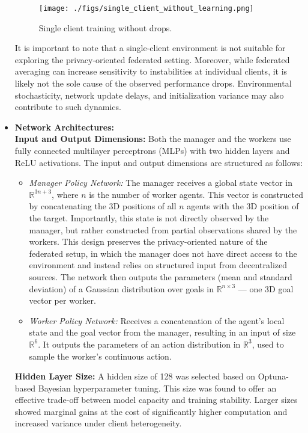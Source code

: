 \documentclass[12pt,a4paper,twoside,openany]{book}
\begin{document}
\begin{itemize}
\begin{figure}[h]
\centering
\texttt{[image: ./figs/single\_client\_without\_learning.png]}
\captionsetup{font=small}
\caption{Single client training without drops.}
\label{fig:single_client_stable}
\end{figure}

It is important to note that a single-client environment is not suitable for exploring the privacy-oriented federated setting. Moreover, while federated averaging can increase sensitivity to instabilities at individual clients, it is likely not the sole cause of the observed performance drops. Environmental stochasticity, network update delays, and initialization variance may also contribute to such dynamics.

\item \textbf{Network Architectures:} \\[0.5em]
\textbf{Input and Output Dimensions:} Both the manager and the workers use fully connected multilayer perceptrons (MLPs) with two hidden layers and ReLU activations. The input and output dimensions are structured as follows:
\begin{itemize}
   \item \textit{Manager Policy Network:} The manager receives a global state vector in $\mathbb{R}^{3n + 3}$, where $n$ is the number of worker agents. This vector is constructed by concatenating the 3D positions of all $n$ agents with the 3D position of the target. Importantly, this state is not directly observed by the manager, but rather constructed from partial observations shared by the workers. This design preserves the privacy-oriented nature of the federated setup, in which the manager does not have direct access to the environment and instead relies on structured input from decentralized sources. The network then outputs the parameters (mean and standard deviation) of a Gaussian distribution over goals in $\mathbb{R}^{n \times 3}$ — one 3D goal vector per worker.
    \item \textit{Worker Policy Network:} Receives a concatenation of the agent’s local state and the goal vector from the manager, resulting in an input of size $\mathbb{R}^6$. It outputs the parameters of an action distribution in $\mathbb{R}^3$, used to sample the worker’s continuous action.
\end{itemize}

\textbf{Hidden Layer Size:} A hidden size of 128 was selected based on Optuna-based Bayesian hyperparameter tuning. This size was found to offer an effective trade-off between model capacity and training stability. Larger sizes showed marginal gains at the cost of significantly higher computation and increased variance under client heterogeneity.


\end{itemize}
\end{document}
